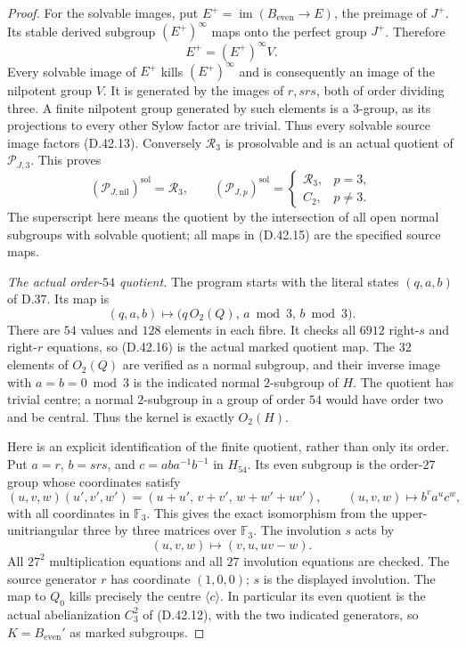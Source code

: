 \begin{proof}
For the solvable images, put $E^+=\operatorname{im}
(B_{\mathrm{even}}\to E)$, the preimage of $J^+$.
Its stable derived subgroup $(E^+)^\infty$
maps onto the perfect group $J^+$. Therefore
\[
 E^+=(E^+)^\infty V.
 \]
Every solvable image of $E^+$ kills
$(E^+)^\infty$ and is consequently an image
of the nilpotent group $V$. It is generated
by the images of $r,srs$, both of order
dividing three. A finite nilpotent group
generated by such elements is a $3$-group,
as its projections to every other Sylow
factor are trivial. Thus every solvable
source image factors (D.42.13).
Conversely $\mathcal R_3$ is prosolvable
and is an actual quotient of
$\mathcal P_{J,3}$. This proves
\[
 (\mathcal P_{J,\mathrm{nil}})^{\mathrm{sol}}
       =\mathcal R_3,\qquad
 (\mathcal P_{J,p})^{\mathrm{sol}}
       =\begin{cases}\mathcal R_3,&p=3,\\C_2,&p\ne3.
         \end{cases}                                 \tag{D.42.15}
\]
The superscript here means the quotient by
the intersection of all open normal subgroups
with solvable quotient; all maps in (D.42.15)
are the specified source maps.

\emph{The actual order-$54$ quotient.}
The program starts with the literal states
$(q,a,b)$ of D.37. Its map is
\[
 (q,a,b)\longmapsto
       \bigl(q\,O_2(Q),\,a\bmod3,\,b\bmod3\bigr).
                                                               \tag{D.42.16}
\]
There are $54$ values and $128$ elements in
each fibre. It checks all $6912$ right-$s$
and right-$r$ equations, so (D.42.16)
is the actual marked quotient map.
The $32$ elements of $O_2(Q)$ are verified
as a normal subgroup, and their inverse
image with $a=b=0\bmod3$ is the indicated
normal $2$-subgroup of $H$. The quotient
has trivial centre; a normal $2$-subgroup
in a group of order $54$ would have order
two and be central. Thus the kernel is
exactly $O_2(H)$.

Here is an explicit identification of the
finite quotient, rather than only its order.
Put $a=r$, $b=srs$, and $c=aba^{-1}b^{-1}$
in $H_{54}$. Its even subgroup is the
order-$27$ group whose coordinates satisfy
\[
 (u,v,w)(u',v',w')
   =(u+u',\,v+v',\,w+w'+uv'),\qquad
 (u,v,w)\longmapsto b^v a^u c^w,                       \tag{D.42.17}
\]
with all coordinates in $\mathbb F_3$.
This gives the exact isomorphism from the
upper-unitriangular three by three matrices
over $\mathbb F_3$. The involution $s$ acts by
\[
 (u,v,w)\longmapsto(v,u,uv-w).                         \tag{D.42.18}
\]
All $27^2$ multiplication equations and all
$27$ involution equations are checked.
The source generator $r$ has coordinate
$(1,0,0)$; $s$ is the displayed involution.
The map to $Q_0$ kills precisely the centre
$\langle c\rangle$. In particular its even
quotient is the actual abelianization
$C_3^2$ of (D.42.12), with the two indicated
generators, so $K=B_{\mathrm{even}}'$ as
marked subgroups.


\end{proof}
